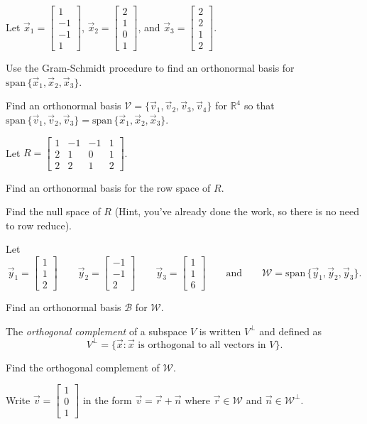 \documentclass[14pt]{problemset}
\newcommand{\R}{\mathbb{R}}
\renewcommand{\span}{\mathrm{span}\,}
\newcommand{\mat}[1]{\begin{bmatrix}#1\end{bmatrix}}
\begin{document}
	\question
	Let $\vec x_1=\mat{1\\-1\\-1\\1}$, $\vec x_2=\mat{2\\1\\0\\1}$, and 
	$\vec x_3=\mat{2\\2\\1\\2}$.
	\begin{parts}
		\item Use the Gram-Schmidt procedure to find an orthonormal basis for 
			$\span\{\vec x_1,\vec x_2,\vec x_3\}$.
		\item Find an orthonormal basis $\mathcal V=\{\vec v_1,\vec v_2,\vec v_3,\vec v_4\}$
			for $\R^4$ so that $\span\{\vec v_1,\vec v_2,\vec v_3\}=
			\span\{\vec x_1,\vec x_2,\vec x_3\}$.
	\end{parts}
	Let $R=\mat{1&-1&-1&1\\2&1&0&1\\2&2&1&2}$.
	\begin{parts}[resume]
		\item Find an orthonormal basis for the row space of $R$.
		\item Find the null space of $R$ (Hint, you've already done the work, so
			there is no need to row reduce).
	\end{parts}

	\question
	Let
	\[
		\vec y_1=\mat{1\\1\\2}\qquad 
		\vec y_2=\mat{-1\\-1\\2}\qquad
		\vec y_3=\mat{1\\1\\6} \qquad\text{and}\qquad \mathcal W=\span\{\vec y_1,\vec y_2,\vec y_3\}.
	\]
	\begin{parts}
		\item Find an orthonormal basis $\mathcal B$ for $\mathcal W$.
	\end{parts}

	\begin{definition}
		The \emph{orthogonal complement} of a subspace $V$ is written
		$V^\perp$ and defined as
		\[
			V^\perp=\{\vec x:\vec x\text{ is orthogonal to all vectors in }V\}.
		\]
		\vspace{-.2in}
	\end{definition}

	\begin{parts}[resume]
		\item Find the orthogonal complement of $\mathcal W$.
		\item Write $\vec v=\mat{1\\0\\1}$ in the form $\vec v=\vec r+\vec n$ where 
			$\vec r\in\mathcal W$ and $\vec n\in{\mathcal W}^\perp$.
	\end{parts}
\end{document}
